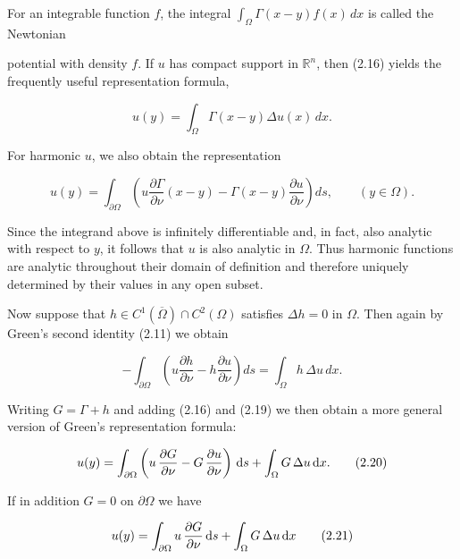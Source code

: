 For an integrable function $f$, the integral $\int_\Omega \Gamma(x-y)f(x)\,dx$ is called the Newtonian

potential with density $f$. If $u$ has compact support in $\mathbb{R}^n$, then (2.16) yields the
frequently useful representation formula,

\begin{equation}
\tag{2.17}
u(y)= \int_{\Omega}\Gamma(x-y)\Delta u(x)\,dx.
\end{equation}

For harmonic $u$, we also obtain the representation

\begin{equation}
\tag{2.18}
u(y)= \int_{\partial\Omega}\left(u \frac{\partial \Gamma}{\partial \nu}(x-y)-\Gamma(x-y)\frac{\partial u}{\partial \nu}\right)ds, \qquad (y\in \Omega).
\end{equation}

Since the integrand above is infinitely differentiable and, in fact, also analytic with
respect to $y$, it follows that $u$ is also analytic in $\Omega$. Thus harmonic functions are
analytic throughout their domain of definition and therefore uniquely determined
by their values in any open subset.

Now suppose that $h\in C^1(\overline{\Omega})\cap C^2(\Omega)$ satisfies $\Delta h=0$ in $\Omega$. Then again by
Green's second identity (2.11) we obtain

\begin{equation}
\tag{2.19}
-\int_{\partial\Omega}\left(u\frac{\partial h}{\partial \nu}-h\frac{\partial u}{\partial \nu}\right)ds
= \int_\Omega h\,\Delta u\,dx.
\end{equation}





Writing $G=\Gamma+h$ and adding (2.16) and (2.19) we then obtain a more general version of Green's representation formula:

\begin{equation}
u(y)=\int_{\partial \Omega}\left(u\,\frac{\partial G}{\partial \nu}-G\,\frac{\partial u}{\partial \nu}\right)\,\mathrm{d} s+\int_{\Omega}G\,\Delta u\,\mathrm{d} x.
\tag{2.20}
\end{equation}

If in addition $G=0$ on $\partial \Omega$ we have

\begin{equation}
u(y)=\int_{\partial \Omega}u\,\frac{\partial G}{\partial \nu}\,\mathrm{d} s+\int_{\Omega}G\,\Delta u\,\mathrm{d} x
\tag{2.21}
\end{equation}

